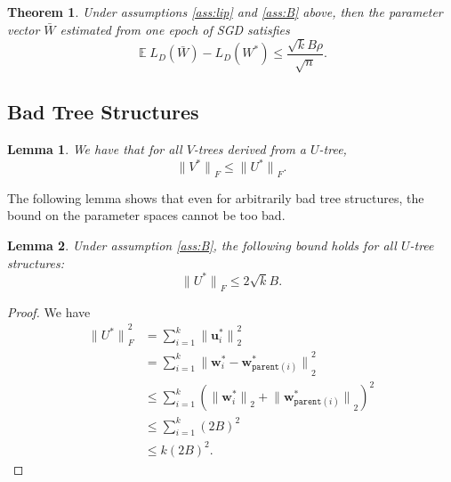 \documentclass[twoside]{article}
\newtheorem{lemma}{Lemma}
\newtheorem{theorem}{Theorem}
\DeclareMathOperator{\E}{\mathbb E}
\newcommand{\parent}[1]{\texttt{parent}({#1})}
\renewcommand{\star}[1]{{#1}^{*}}
\newcommand{\uu}{\mathbf u}
\newcommand{\w}{\mathbf w}
\newcommand{\ltwo}[1]{{\lVert {#1} \rVert}_2}
\newcommand{\lF}[1]{{\lVert {#1} \rVert}_F}
\newcommand{\fixme}[1]{}
\begin{document}
\begin{theorem}
\label{theorem:xentropy}
    Under assumptions \ref{ass:lip} and \ref{ass:B} above,
then the parameter vector $\bar W$ estimated from one epoch of SGD satisfies
\begin{equation}
    \E L_D(\bar W) - L_D(W^*)
    \le \frac {\sqrt kB\rho}{\sqrt n}
    .
\end{equation}
\end{theorem}
\fixme{
It is important to note that this result above is an upper bound and not a lower bound.
This $O(\sqrt{k/n})$ convergence rate matches the convergence rate implied by the Nataranj dimension \citep{}.
We are not aware of any lower bounds for SGD in the Lipschitz setting.
\citet{nguyen2018tight,jentzen2020lower} study the strongly convex case and find that the upper bounds match the lower bounds.
}

\subsection {Bad Tree Structures}

\begin{lemma}
    \label{lemma:starV}
    We have that for all $V$-trees derived from a $U$-tree,
    \begin{equation}
        \lF{\star V} \le \lF{\star U}.
    \end{equation}
\end{lemma}
\fixme{
\begin{proof}
\end{proof}
}

The following lemma shows that even for arbitrarily bad tree structures,
the bound on the parameter spaces cannot be too bad.

\begin{lemma}
    \label{lemma:starU}
    Under assumption \ref{ass:B},
    the following bound holds for all $U$-tree structures:
    \begin{equation}
        \lF{\star U} \le 2\sqrt{k}B.
    \end{equation}
\end{lemma}
\begin{proof}
    We have
    \begin{align}
        \lF{\star U}^2 
        &= \sum_{i=1}^k \ltwo{\star\uu_i}^2 \\
        &= \sum_{i=1}^k \ltwo{\star\w_i - \star\w_{\parent{i}}}^2 \\
        &\le \sum_{i=1}^k \left(\ltwo{\star\w_i} + \ltwo{\star\w_{\parent{i}}} \right)^2 \\
        &\le \sum_{i=1}^k (2B)^2 \\
        &\le k (2B)^2
        .
    \end{align}
\end{proof}
\end{document}
